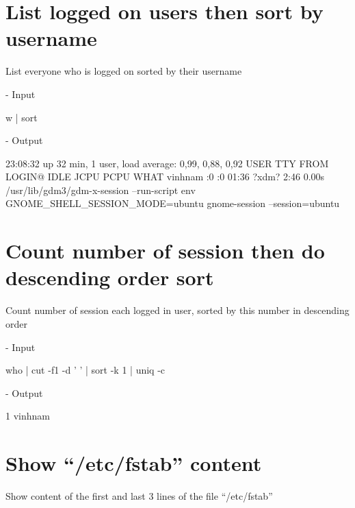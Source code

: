 \documentclass[10pt, a4paper]{article}
\begin{document}
\fbox{
\theverbbox
}

\section{List logged on users then sort by username}

List everyone who is logged on sorted by their username

\noindent - Input

\begin{verbbox}
w | sort
\end{verbbox}

\fbox{
\theverbbox
}

\noindent - Output

\begin{verbbox}
 23:08:32 up 32 min,  1 user,  load average: 0,99, 0,88, 0,92
USER     TTY      FROM             LOGIN@   IDLE   JCPU   PCPU WHAT
vinhnam  :0       :0               01:36   ?xdm?   2:46   0.00s /usr/lib/gdm3/gdm-x-session
--run-script env GNOME_SHELL_SESSION_MODE=ubuntu gnome-session --session=ubuntu
\end{verbbox}

\fbox{
\theverbbox
}

\section{Count number of session then do descending order sort}

Count number of session each logged in user, sorted by this number in descending order

\noindent - Input

\begin{verbbox}
who | cut -f1 -d ' ' | sort -k 1 | uniq -c
\end{verbbox}

\fbox{
\theverbbox
}

\noindent - Output

\begin{verbbox}
      1 vinhnam 
\end{verbbox}

\fbox{
\theverbbox
}

\section{Show “/etc/fstab” content}

Show content of the first and last 3 lines of the file “/etc/fstab”
\end{document}
